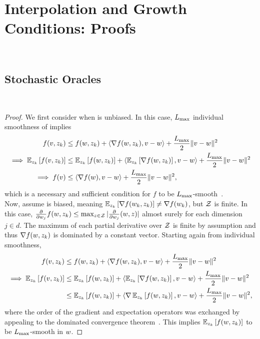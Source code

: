 
\chapter{Interpolation and Growth Conditions: Proofs}~\label{app:interpolation-gc}

\section{Stochastic Oracles}~\label{app:stochastic-oracles}

\indSmoothToSmooth*
\begin{proof}
    We first consider when \oracle{} is unbiased. In this case, \( L_{\text{max}} \) individual smoothness of \oracle{} implies
    \begin{align*}
        f(v, z_{k}) &\leq f(w, z_{k}) + \left\langle\nabla f(w, z_{k}), v - w\right\rangle + \frac{L_{\text{max}}}{2} \|v - w\|^2\\
        \implies \mathbb{E}_{z_{k}} \left[f(v, z_{k})\right] &\leq \mathbb{E}_{z_{k}} \left[f(w, z_{k})\right] + \left\langle\mathbb{E}_{z_{k}} \left[\nabla f(w, z_{k})\right], v - w\right\rangle + \frac{L_{\text{max}}}{2} \|v - w\|^2\\
        \implies f(v) &\leq \left\langle\nabla f(w), v - w\right\rangle + \frac{L_{\text{max}}}{2}\|v - w\|^2, 
    \end{align*}
    which is a necessary and sufficient condition for \( f \) to be \( L_{\text{max}} \)-smooth~\citep[Theorem 2.1.5]{nesterov2004lectures}.\\

    Now, assume \oracle{} is biased, meaning \( \mathbb{E}_{z_{k}}\left[\nabla f(w_k, z_{k})\right] \neq \nabla f(w_k) \), but \( \mathcal{Z} \) is finite.
    In this case, \( \frac{\partial}{\partial w_j} f(w, z_{k}) \leq \max_{z \in \mathcal{Z}} | \frac{\partial}{\partial w_j} (w, z)| \) almost surely for each dimension \( j \in d \).
    The maximum of each partial derivative over \( \mathcal{Z} \) is finite by assumption and thus \( \nabla f(w, z_{k}) \) is dominated by a constant vector.
    Starting again from individual smoothness,
    \begin{align*}
        f(v, z_{k}) &\leq f(w, z_{k}) + \left\langle\nabla f(w, z_{k}), v - w\right\rangle + \frac{L_{\text{max}}}{2} \|v - w\|^2\\
        \implies \mathbb{E}_{z_{k}} \left[f(v, z_{k})\right] &\leq \mathbb{E}_{z_{k}} \left[f(w, z_{k})\right] + \left\langle\mathbb{E}_{z_{k}} \left[\nabla f(w, z_{k})\right], v - w\right\rangle + \frac{L_{\text{max}}}{2} \|v - w\|^2\\
                                     &\leq \mathbb{E}_{z_{k}} \left[f(w, z_{k})\right] + \left\langle\nabla \, \mathbb{E}_{z_{k}} \left[f(w, z_{k})\right], v - w\right\rangle + \frac{L_{\text{max}}}{2} \|v - w\|^2,
    \end{align*}
    where the order of the gradient and expectation operators was exchanged by appealing to the dominated convergence theorem~\citep[Theorem 4.16]{ccinlar2011probability}.
    This implies \( \mathbb{E}_{z_{k}}\left[f(w, z_{k})\right] \) to be \( L_{\text{max}} \)-smooth in \( w \).
\end{proof}

